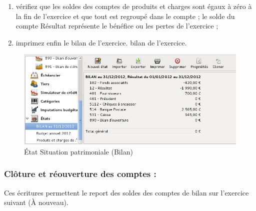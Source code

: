 \begin{enumerate}
	\item vérifiez que les soldes des comptes de produits et charges sont égaux à zéro à la fin de l'exercice et que tout est regroupé dans le compte  ; le solde du compte Résultat représente le bénéfice ou les pertes de l'exercice ;
	\item imprimez enfin le \ifIllustration bilan de l'exercice.
	\else bilan de l'exercice.
	\fi
\end{enumerate}

\ifIllustration
\begin{figure}[p]
\begin{center}
\includegraphics[scale=0.5]{image/screenshot/asso_balanceSheet}
\end{center}
\caption{État Situation patrimoniale (Bilan)}
\label{asso-balanceSheet-img}
\end{figure}
\fi

\ifIllustration
\newpage
\newpage
\newpage
\fi


\subsubsection {Clôture et réouverture des comptes :}

Ces écritures permettent le report des soldes des comptes de bilan sur l'exercice suivant (À nouveau).

